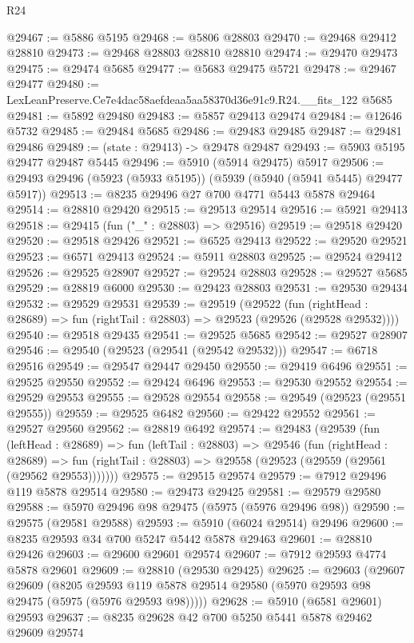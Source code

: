\begin{lexlean}{R24}
\begin{coremodule}
@29467 := @5886 @5195
@29468 := @5806 @28803
@29470 := @29468 @29412 @28810
@29473 := @29468 @28803 @28810 @28810
@29474 := @29470 @29473
@29475 := @29474 @5685
@29477 := @5683 @29475 @5721
@29478 := @29467 @29477
@29480 := LexLeanPreserve.Ce7e4dac58aefdeaa5aa58370d36e91c9.R24.__fits_122 @5685
@29481 := @5892 @29480
@29483 := @5857 @29413 @29474
@29484 := @12646 @5732
@29485 := @29484 @5685
@29486 := @29483 @29485
@29487 := @29481 @29486
@29489 := (state : @29413) -> @29478 @29487
@29493 := @5903 @5195 @29477 @29487 @5445
@29496 := @5910 (@5914 @29475) @5917
@29506 := @29493 @29496 (@5923 (@5933 @5195)) (@5939 (@5940 (@5941 @5445) @29477 @5917))
@29513 := @8235 @29496 @27 @700 @4771 @5443 @5878 @29464
@29514 := @28810 @29420
@29515 := @29513 @29514
@29516 := @5921 @29413
@29518 := @29415 (fun ("_" : @28803) => @29516)
@29519 := @29518 @29420
@29520 := @29518 @29426
@29521 := @6525 @29413
@29522 := @29520 @29521
@29523 := @6571 @29413
@29524 := @5911 @28803
@29525 := @29524 @29412
@29526 := @29525 @28907
@29527 := @29524 @28803
@29528 := @29527 @5685
@29529 := @28819 @6000
@29530 := @29423 @28803
@29531 := @29530 @29434
@29532 := @29529 @29531
@29539 := @29519
    (@29522
      (fun (rightHead : @28689) => fun (rightTail : @28803) => @29523 (@29526 (@29528 @29532))))
@29540 := @29518 @29435
@29541 := @29525 @5685
@29542 := @29527 @28907
@29546 := @29540 (@29523 (@29541 (@29542 @29532)))
@29547 := @6718 @29516
@29549 := @29547 @29447 @29450
@29550 := @29419 @6496
@29551 := @29525 @29550
@29552 := @29424 @6496
@29553 := @29530 @29552
@29554 := @29529 @29553
@29555 := @29528 @29554
@29558 := @29549 (@29523 (@29551 @29555))
@29559 := @29525 @6482
@29560 := @29422 @29552
@29561 := @29527 @29560
@29562 := @28819 @6492
@29574 := @29483
    (@29539
      (fun (leftHead : @28689) =>
      fun (leftTail : @28803) =>
      @29546
        (fun (rightHead : @28689) =>
        fun (rightTail : @28803) => @29558 (@29523 (@29559 (@29561 (@29562 @29553)))))))
@29575 := @29515 @29574
@29579 := @7912 @29496 @119 @5878 @29514
@29580 := @29473 @29425
@29581 := @29579 @29580
@29588 := @5970 @29496 @98 @29475 (@5975 (@5976 @29496 @98))
@29590 := @29575 (@29581 @29588)
@29593 := @5910 (@6024 @29514) @29496
@29600 := @8235 @29593 @34 @700 @5247 @5442 @5878 @29463
@29601 := @28810 @29426
@29603 := @29600 @29601 @29574
@29607 := @7912 @29593 @4774 @5878 @29601
@29609 := @28810 (@29530 @29425)
@29625 := @29603
    (@29607
      @29609
      (@8205 @29593 @119 @5878 @29514 @29580 (@5970 @29593 @98 @29475 (@5975 (@5976 @29593 @98)))))
@29628 := @5910 (@6581 @29601) @29593
@29637 := @8235 @29628 @42 @700 @5250 @5441 @5878 @29462 @29609 @29574

\end{coremodule}
\end{lexlean}
